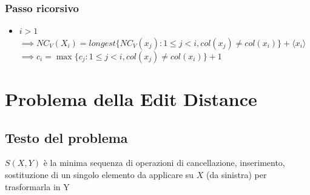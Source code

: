 \subsubsection{Passo ricorsivo}
\begin{itemize}
    \item $i>1$ \\
    $\implies NC_V(X_i) = longest\{NC_V(x_j) : 1 \leq j < i, col(x_j) \not = col(x_i)\} + \langle x_i \rangle$ \\
    $\implies c_i = \max\{c_j : 1 \leq j < i, col(x_j) \not = col(x_i)\} + 1$
\end{itemize} 

\newpage
\section{Problema della Edit Distance}
\subsection{Testo del problema}

$S(X,Y)$ è la minima sequenza di operazioni di cancellazione, inserimento, sostituzione di un singolo elemento da applicare su $X$ (da sinistra) per trasformarla in Y

